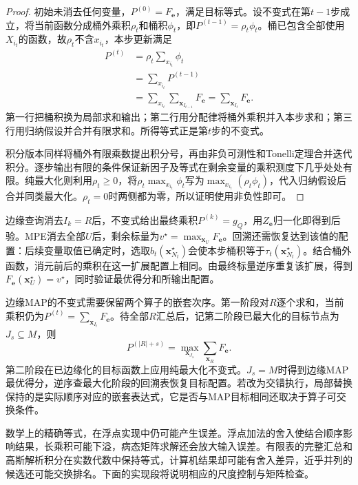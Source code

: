 \begin{proof}
  初始未消去任何变量，$P^{(0)}=F_{\bm{e}}$，满足目标等式。设不变式在第$t-1$步成立，将当前函数分成桶外乘积$\rho_t$和桶积$\phi_t$，即$P^{(t-1)}=\rho_t\phi_t$。桶已包含全部使用$X_{i_t}$的函数，故$\rho_t$不含$x_{i_t}$，本步更新满足
  \[
    \begin{aligned}
      P^{(t)}
      &=\rho_t\sum_{x_{i_t}}\phi_t\\
      &=\sum_{x_{i_t}}P^{(t-1)}\\
      &=\sum_{x_{i_t}}\sum_{\bm{x}_{I_{t-1}}}F_{\bm{e}}
       =\sum_{\bm{x}_{I_t}}F_{\bm{e}}.
    \end{aligned}
  \]
  第一行把桶积换为局部求和输出；第二行用分配律将桶外乘积并入本步求和；第三行用归纳假设并合并有限求和。所得等式正是第$t$步的不变式。

  积分版本同样将桶外有限乘数提出积分号，再由非负可测性和Tonelli定理合并迭代积分。逐步输出有限的条件保证新因子及等式在剩余变量的乘积测度下几乎处处有限。纯最大化则利用$\rho_t\geq0$，将$\rho_t\max_{x_{i_t}}\phi_t$写为$\max_{x_{i_t}}(\rho_t\phi_t)$，代入归纳假设后合并同类最大化。$\rho_t=0$时两侧都为零，所以证明使用非负性即可。
\end{proof}

边缘查询消去$I_k=R$后，不变式给出最终乘积$P^{(k)}=g_Q$，用$Z_{\bm{e}}$归一化即得到后验。MPE消去全部$U$后，剩余标量为$v^\star=\max_{\bm{x}_U}F_{\bm{e}}$。回溯还需恢复达到该值的配置：后续变量取值已确定时，选取$b_t(\bm{x}_{N_t}^\star)$会使本步桶积等于$\tau_t(\bm{x}_{N_t}^\star)$。结合桶外函数，消元前后的乘积在这一扩展配置上相同。由最终标量逆序重复该扩展，得到$F_{\bm{e}}(\bm{x}_U^\star)=v^\star$，同时验证最优得分和所输出配置。

边缘MAP的不变式需要保留两个算子的嵌套次序。第一阶段对$R$逐个求和，当前乘积仍为$P^{(t)}=\sum_{\bm{x}_{I_t}}F_{\bm{e}}$。待全部$R$汇总后，记第二阶段已最大化的目标节点为$J_s\subseteq M$，则
\begin{equation}
  P^{(|R|+s)}
  =\max_{\bm{x}_{J_s}}\sum_{\bm{x}_R}F_{\bm{e}}.
  \label{eq:pgm-elimination-map-invariant}
\end{equation}
第二阶段在已边缘化的目标函数上应用纯最大化不变式。$J_s=M$时得到边缘MAP最优得分，逆序查最大化阶段的回溯表恢复目标配置。若改为交错执行，局部替换保持的是实际顺序对应的嵌套表达式，它是否与MAP目标相同还取决于算子可交换条件。

数学上的精确等式，在浮点实现中仍可能产生误差。浮点加法的舍入使结合顺序影响结果，长乘积可能下溢，病态矩阵求解还会放大输入误差。有限表的完整汇总和高斯解析积分在实数代数中保持等式，计算机结果却可能有舍入差异，近乎并列的候选还可能交换排名。下面的实现段将说明相应的尺度控制与矩阵检查。

